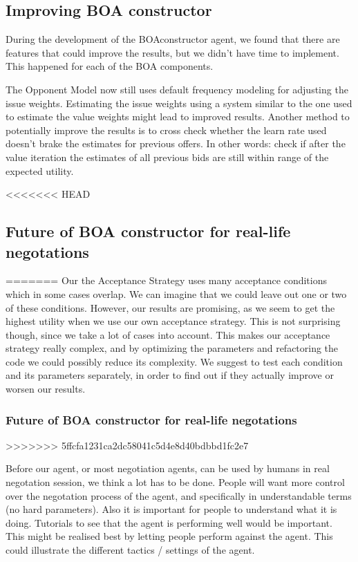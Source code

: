 \subsection{Improving BOA constructor}
During the development of the BOAconstructor agent, we found that there are features that could improve the results, but we didn't have time to implement. This happened for each of the BOA components.


The Opponent Model now still uses default frequency modeling for adjusting the issue weights. Estimating the issue weights using a system similar to the one used to estimate the value weights might lead to improved results. Another method to potentially improve the results is to cross check whether the learn rate used doesn't brake the estimates for previous offers. In other words: check if after the value iteration the estimates of all previous bids are still within range of the expected utility. 

<<<<<<< HEAD
\subsection{Future of BOA constructor for real-life negotations}
=======
Our the Acceptance Strategy uses many acceptance conditions which in some cases overlap. We can imagine that we could leave out one or two of these conditions. However, our results are promising, as we seem to get the highest utility when we use our own acceptance strategy. This is not surprising though, since we take a lot of cases into account. This makes our acceptance strategy really complex, and by optimizing the parameters and refactoring the code we could possibly reduce its complexity. We suggest to test each condition and its parameters separately, in order to find out if they actually improve or worsen our results.

\subsubsection{Future of BOA constructor for real-life negotations}
>>>>>>> 5ffcfa1231ca2dc58041c5d4e8d40bdbbd1fc2e7

Before our agent, or most negotiation agents, can be used by humans in real negotation 
session, we think a lot has to be done. People will want more control over the 
negotation process of the agent, and specifically in understandable terms (no hard parameters).
Also it is important for people to understand what it is doing. 
Tutorials to see that the agent is performing well would be important. 
This might be realised best by letting people perform against the agent. 
This could illustrate the different tactics / settings of the agent.

